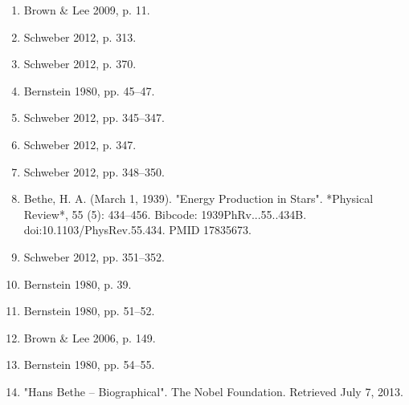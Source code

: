 \begin{enumerate}
\item Brown & Lee 2009, p. 11.  
\item Schweber 2012, p. 313.  
\item Schweber 2012, p. 370.  
\item Bernstein 1980, pp. 45–47.  
\item Schweber 2012, pp. 345–347.  
\item Schweber 2012, p. 347.  
\item Schweber 2012, pp. 348–350.
\item Bethe, H. A. (March 1, 1939). "Energy Production in Stars". *Physical Review*, 55 (5): 434–456. Bibcode: 1939PhRv...55..434B. doi:10.1103/PhysRev.55.434. PMID 17835673.  
\item Schweber 2012, pp. 351–352.  
\item Bernstein 1980, p. 39.  
\item Bernstein 1980, pp. 51–52.  
\item Brown & Lee 2006, p. 149.  
\item Bernstein 1980, pp. 54–55.  
\item "Hans Bethe – Biographical". The Nobel Foundation. Retrieved July 7, 2013.
\end{enumerate}